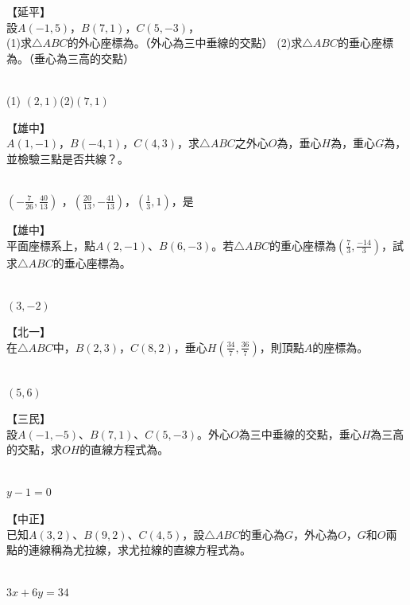 \documentclass
[answers]
{exam}
\newcommand\ul[1]{\uline{\hspace*{#1}}}
\theoremstyle{definition}
\begin{document}
\begin{questions}
\question
【延平】\\
設$A\left( -1,5\right)$，$B\left( 7,1\right)$，$C\left( 5,-3\right)$，\\
(1)求$\triangle ABC$的外心座標為\ul{50pt}。（外心為三中垂線的交點）
(2)求$\triangle ABC$的垂心座標為\ul{50pt}。（垂心為三高的交點）
\begin{solution}~\\
	(1) $\left( 2,1\right)$(2)$\left( 7,1\right)$
\end{solution}

\question
【雄中】\\
$A\left( 1,-1\right)$，$B\left( -4,1\right)$，$C\left( 4,3\right)$，求$\triangle ABC$之外心$O$為\ul{50pt}，垂心$H$為\ul{50pt}，重心$G$為\ul{50pt}，並檢驗三點是否共線？\ul{50pt}。
\begin{solution}~\\
	$\left( -\frac{7}{26} ,\frac{40}{13} \right)$ ，$\left( \frac{20}{13},-\frac{41}{13} \right)$，$\left( \frac{1}{3},1 \right)$，是
\end{solution}

\question
【雄中】\\
平面座標系上，點$A\left( 2,-1\right)$、$B\left( 6,-3\right)$。若$\triangle ABC$的重心座標為$\left( \frac{7}{3},\frac{-14}{3}\right)$，試求$\triangle ABC$的垂心座標為\ul{50pt}。
\begin{solution}~\\
	$\left( 3,-2 \right)$
\end{solution}

\question
【北一】\\
在$\triangle ABC$中，$B\left( 2,3\right)$，$C\left( 8,2\right)$，垂心$H\left( \frac{34}{7},\frac{36}{7}\right)$，則頂點$A$的座標為\ul{50pt}。
\begin{solution}~\\
	$\left( 5,6\right)$
\end{solution}

\question
【三民】\\
設$A\left( -1,-5\right)$、$B\left( 7,1\right)$、$C\left( 5,-3\right)$。外心$O$為三中垂線的交點，垂心$H$為三高的交點，求$OH$的直線方程式為\ul{50pt}。
\begin{solution}~\\
	$y-1=0$
\end{solution}

\question
【中正】\\
已知$A\left( 3,2\right)$、$B\left( 9,2\right)$、$C\left( 4,5\right)$，設$\triangle  ABC$的重心為$G$，外心為$O$，$G$和$O$兩點的連線稱為尤拉線，求尤拉線的直線方程式為\ul{50pt}。
\begin{solution}~\\
	$3x+6y=34$
\end{solution}


\end{questions}
\end{document}

